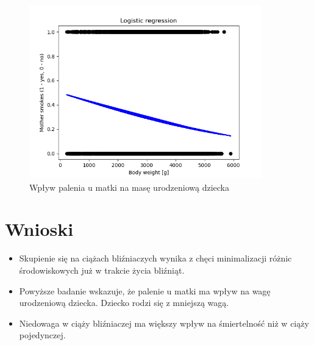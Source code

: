 \documentclass{classrep}
\begin{document}
        \begin{figure}[H]
            \centering
            \includegraphics[width=0.9\textwidth]{images/images2/LogisticRegression.png}
            \caption{Wpływ palenia u matki na masę urodzeniową dziecka}
            \label{fig2}
        \end{figure}


\section{Wnioski}

    \begin{itemize}
       
        \item Skupienie się na ciążach bliźniaczych wynika z chęci minimalizacji różnic środowiskowych już w trakcie życia bliźniąt.
        \item Powyższe badanie wskazuje, że palenie u matki ma wpływ na wagę urodzeniową dziecka. Dziecko rodzi się z mniejszą wagą.
        \item Niedowaga w ciąży bliźniaczej ma większy wpływ na śmiertelność niż w ciąży pojedynczej.
    \end{itemize}
\end{document}
